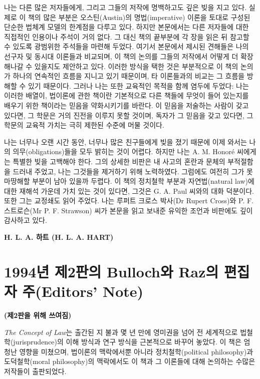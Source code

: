 \documentclass[12pt, oneside]{book}  %
\begin{document}
나는 다른 많은 저자들에게, 그리고 그들의 저작에 명백하고도 깊은 빚을
지고 있다. 실제로 이 책의 많은 부분은 오스틴(Austin)의 명법(imperative)
이론을 토대로 구성된 단순한 법체계 모델의 한계점을 다루고 있다. 하지만
본문에서는 다른 저자들에 대한 직접적인 인용이나 주석이 거의 없다. 그
대신 책의 끝부분에 각 장을 읽은 뒤 참고할 수 있도록 광범위한 주석들을
마련해 두었다. 여기서 본문에서 제시된 견해들은 나의 선구자 및 동시대
이론들과 비교되며, 이 책의 논의를 그들의 저작에서 어떻게 더 확장해나갈
수 있을지도 제안하고 있다. 이러한 방식을 택한 것은 부분적으로 이 책의
논의가 하나의 연속적인 흐름을 지니고 있기 때문이며, 타 이론들과의 비교는
그 흐름을 방해할 수 있기 때문이다. 그러나 나는 또한 교육적인 목적을 함께
염두에 두었다: 나는 이러한 배열이, 법이론에 관한 책이란 기본적으로 다른
책들에 무엇이 들어 있는지를 배우기 위한 책이라는 믿음을 약화시키기를
바란다. 이 믿음을 저술하는 사람이 갖고 있다면, 그 학문은 거의 진전을
이루지 못할 것이며, 독자가 그 믿음을 갖고 있다면, 그 학문의 교육적
가치는 극히 제한된 수준에 머물 것이다.

나는 너무나 오랜 시간 동안, 너무나 많은 친구들에게 빚을 졌기 때문에 이제
와서는 나의 의무(obligations)들을 모두 밝히는 것이 어렵다. 하지만 나는
A. M. Honoré 씨에게는 특별한 빚을 고백해야 한다. 그의 상세한 비판은 내
사고의 혼란과 문체의 부적절함을 드러내 주었고, 나는 그것들을 제거하기
위해 노력하였다. 그럼에도 여전히 그가 못마땅해할 부분이 남아 있을까
두렵다. 이 책의 정치철학 부분과 자연법(natural law)에 대한 재해석 가운데
가치 있는 것이 있다면, 그것은 G. A. Paul 씨와의 대화 덕분이다. 또한 그는
교정쇄도 읽어 주었다. 나는 루퍼트 크로스 박사(Dr Rupert Cross)와 P. F.
스트로슨(Mr P. F. Strawson) 씨가 본문을 읽고 보내준 유익한 조언과
비판에도 깊이 감사하고 있다.

\vspace{1em}
\begin{flushright}
\textbf{H. L. A. 하트 (H. L. A. HART)}
\end{flushright}

\newpage

\section{1994년 제2판의 Bulloch와 Raz의 편집자 주(Editors'
Note)}\label{uxb144-uxc81c2uxd310uxc758-bullochuxc640-razuxc758-uxd3b8uxc9d1uxc790-uxc8fceditors-note}

\textbf{(제2판을 위해 쓰여짐)}

\emph{The Concept of Law}는 출간된 지 불과 몇 년 만에 영미권을 넘어 전
세계적으로 법철학(jurisprudence)의 이해 방식과 연구 방식을 근본적으로
바꾸어 놓았다. 이 책은 엄청난 영향을 미쳤으며, 법이론의 맥락에서뿐
아니라 정치철학(political philosophy)과 도덕철학(moral philosophy)의
맥락에서도 이 책과 그 이론들에 대해 논의하는 수많은 저작들이 출판되었다.
\end{document}
